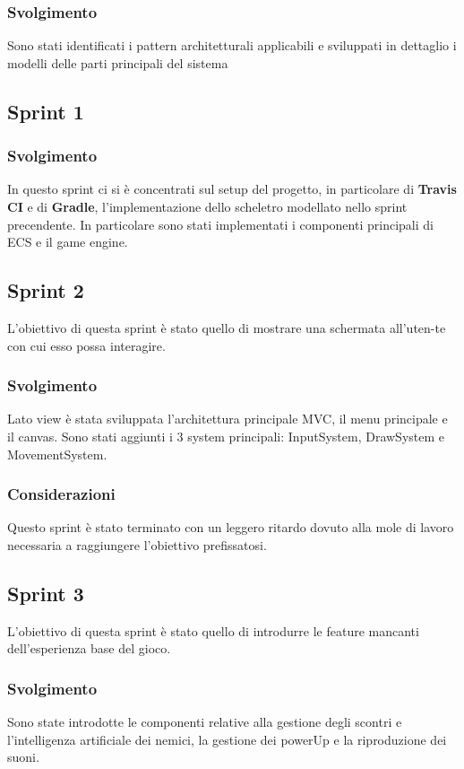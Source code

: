 \subsubsection{Svolgimento}
Sono stati identificati i pattern architetturali applicabili e sviluppati in dettaglio i modelli delle parti principali del sistema


\subsection{Sprint 1}
\subsubsection{Svolgimento}
In questo sprint ci si è concentrati sul setup del progetto, in particolare di \textbf{Travis CI} e di \textbf{Gradle}, l'implementazione dello scheletro modellato nello sprint precendente.
In particolare sono stati implementati i componenti principali di ECS e il game engine.

\subsection{Sprint 2}
L'obiettivo di questa sprint è stato quello di mostrare una schermata all'uten-te con cui esso possa interagire.
\subsubsection{Svolgimento}
Lato view è stata sviluppata l'architettura principale MVC, il menu principale e il canvas.
Sono stati aggiunti i 3 system principali: InputSystem, DrawSystem e MovementSystem.
\subsubsection{Considerazioni}
Questo sprint è stato terminato con un leggero ritardo dovuto alla mole di lavoro necessaria a raggiungere l'obiettivo prefissatosi.
\subsection{Sprint 3}
L'obiettivo di questa sprint è stato quello di introdurre le feature mancanti dell'esperienza base del gioco.
\subsubsection{Svolgimento}
Sono state introdotte le componenti relative alla gestione degli scontri e l'intelligenza artificiale dei nemici, la gestione dei powerUp e la riproduzione dei suoni.
